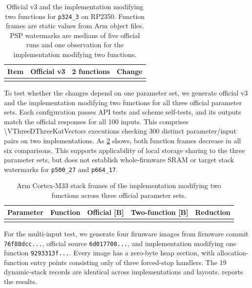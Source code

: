 \documentclass[a4paper,10pt]{article}
\theoremstyle{definition}
\theoremstyle{remark}
\begin{document}
\begin{table}[H]
  \centering
  \caption{Official v3 and the implementation modifying two functions for \texttt{p324\_3} on RP2350. Function frames are static values from Arm object files. PSP watermarks are medians of five official runs and one observation for the implementation modifying two functions.}
  \label{tab:v3-two-function-target}
  \small
  \begin{tabular}{@{}lrrr@{}}
    \toprule
    Item & Official v3 & 2 functions & Change \\
    \midrule
    \\
    \bottomrule
  \end{tabular}
\end{table}

To test whether the changes depend on one parameter set, we generate official v3 and the implementation modifying two functions for all three official parameter sets. Each configuration passes API tests and scheme self-tests, and its outputs match the official responses for all 100 inputs. This comprises \num{\VThreeDThreeKatVectors} executions checking 300 distinct parameter/input pairs on two implementations. As \cref{tab:v3-all-parameter-frames} shows, both function frames decrease in all six comparisons. This supports applicability of local storage sharing to the three parameter sets, but does not establish whole-firmware SRAM or target stack watermarks for \texttt{p500\_27} and \texttt{p664\_17}.

\begin{table}[H]
  \centering
  \caption{Arm Cortex-M33 stack frames of the implementation modifying two functions across three official parameter sets.}
  \label{tab:v3-all-parameter-frames}
  \scriptsize
  \begin{tabular}{@{}llrrr@{}}
    \toprule
    Parameter & Function & Official [B] & Two-function [B] & Reduction \\
    \midrule
    \\
    \bottomrule
  \end{tabular}
\end{table}

For the multi-input test, we generate four firmware images from firmware commit \texttt{76f88dcc...}, official source \texttt{6d017708...}, and implementation modifying one function \texttt{9293313f...}. Every image has a zero-byte heap section, with allocation-function entry points consisting only of three forced-stop handlers. The 19 dynamic-stack records are identical across implementations and layouts.  reports the results.
\end{document}
